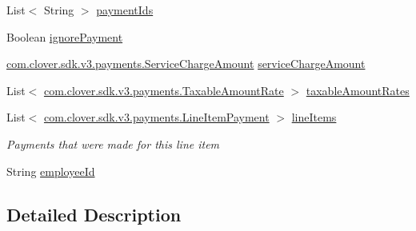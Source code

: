 \begin{DoxyCompactItemize}
List$<$ String $>$ \hyperlink{classcom_1_1clover_1_1sdk_1_1v3_1_1payments_1_1_gift_card_transaction_a19c90ed1aa783de3c28043039caa3372}{payment\+Ids}
\item 
Boolean \hyperlink{classcom_1_1clover_1_1sdk_1_1v3_1_1payments_1_1_gift_card_transaction_aed2d1eaccf0f720e698321c9b03b6b60}{ignore\+Payment}
\item 
\hyperlink{classcom_1_1clover_1_1sdk_1_1v3_1_1payments_1_1_service_charge_amount}{com.\+clover.\+sdk.\+v3.\+payments.\+Service\+Charge\+Amount} \hyperlink{classcom_1_1clover_1_1sdk_1_1v3_1_1payments_1_1_gift_card_transaction_a0f02dfd0839750249df0fc3d02d1fbe2}{service\+Charge\+Amount}
\item 
List$<$ \hyperlink{classcom_1_1clover_1_1sdk_1_1v3_1_1payments_1_1_taxable_amount_rate}{com.\+clover.\+sdk.\+v3.\+payments.\+Taxable\+Amount\+Rate} $>$ \hyperlink{classcom_1_1clover_1_1sdk_1_1v3_1_1payments_1_1_gift_card_transaction_a22e5623ae0057b227d786975e4172d07}{taxable\+Amount\+Rates}
\item 
List$<$ \hyperlink{classcom_1_1clover_1_1sdk_1_1v3_1_1payments_1_1_line_item_payment}{com.\+clover.\+sdk.\+v3.\+payments.\+Line\+Item\+Payment} $>$ \hyperlink{classcom_1_1clover_1_1sdk_1_1v3_1_1payments_1_1_gift_card_transaction_aa0b495fa50df930fb73bea83cf88862d}{line\+Items}
\begin{DoxyCompactList}\small\item\em Payments that were made for this line item \end{DoxyCompactList}\item 
String \hyperlink{classcom_1_1clover_1_1sdk_1_1v3_1_1payments_1_1_gift_card_transaction_af7adc933f78567f624ce8f8badc9cadc}{employee\+Id}
\end{DoxyCompactItemize}


\subsection{Detailed Description}


